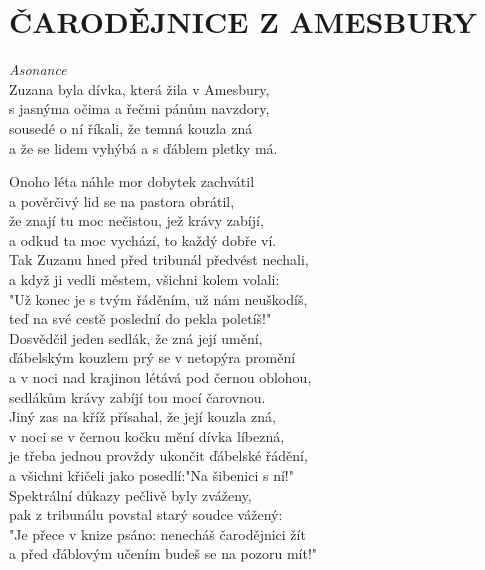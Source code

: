 \section*{\Huge ČARODĚJNICE Z AMESBURY}
\emph{Asonance}\\

Zuzana byla dívka, která žila v Amesbury,\\
s jasnýma očima a řečmi pánům navzdory,\\
sousedé o ní říkali, že temná kouzla zná\\
a že se lidem vyhýbá a s ďáblem pletky má.\\

\begin{large}

Onoho léta náhle mor dobytek zachvátil\\
a pověrčivý lid se na pastora obrátil,\\
že znají tu moc nečistou, jež krávy zabíjí,\\
a odkud ta moc vychází, to každý dobře ví.\\

Tak Zuzanu hned před tribunál předvést nechali,\\
a když ji vedli městem, všichni kolem volali:\\
"Už konec je s tvým řáděním, už nám neuškodíš,\\
teď na své cestě poslední do pekla poletíš!"\\

Dosvědčil jeden sedlák, že zná její umění,\\
ďábelským kouzlem prý se v netopýra promění\\
a v noci nad krajinou létává pod černou oblohou,\\
sedlákům krávy zabíjí tou mocí čarovnou.\\

Jiný zas na kříž přísahal, že její kouzla zná,\\
v noci se v černou kočku mění dívka líbezná,\\
je třeba jednou provždy ukončit ďábelské řádění,\\
a všichni křičeli jako posedlí:"Na šibenici s ní!"\\

Spektrální důkazy pečlivě byly zváženy,\\
pak z tribunálu povstal starý soudce vážený:\\
"Je přece v knize psáno: nenecháš čarodějnici žít\\
a před ďáblovým učením budeš se na pozoru mít!"\\


\end{large}
